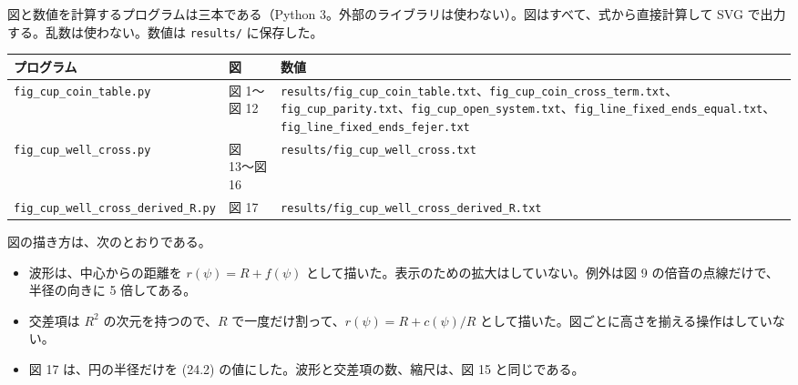 \documentclass[
  a4paper,
]{ltjsarticle}
\newcounter{none} %
\providecommand{\tightlist}{%
  \setlength{\itemsep}{0pt}\setlength{\parskip}{0pt}}
\begin{document}
図と数値を計算するプログラムは三本である（Python
3。外部のライブラリは使わない）。図はすべて、式から直接計算して SVG
で出力する。乱数は使わない。数値は \texttt{results/\allowbreak{}} に保存した。

{\def\LTcaptype{none} %
\begin{longtable}[]{@{}
  >{\raggedright\arraybackslash}p{}
  >{\raggedright\arraybackslash}p{}
  >{\raggedright\arraybackslash}p{}@{}}
\toprule\noalign{}
\begin{minipage}[b]{\linewidth}\raggedright
プログラム
\end{minipage} & \begin{minipage}[b]{\linewidth}\raggedright
図
\end{minipage} & \begin{minipage}[b]{\linewidth}\raggedright
数値
\end{minipage} \\
\midrule\noalign{}
\endhead
\bottomrule\noalign{}
\endlastfoot
\texttt{fig\_\allowbreak{}cup\_\allowbreak{}coin\_\allowbreak{}table.py} & 図 1〜図 12 &
\texttt{results/\allowbreak{}fig\_\allowbreak{}cup\_\allowbreak{}coin\_\allowbreak{}table.txt}、\texttt{fig\_\allowbreak{}cup\_\allowbreak{}coin\_\allowbreak{}cross\_\allowbreak{}term.txt}、\texttt{fig\_\allowbreak{}cup\_\allowbreak{}parity.txt}、\texttt{fig\_\allowbreak{}cup\_\allowbreak{}open\_\allowbreak{}system.txt}、\texttt{fig\_\allowbreak{}line\_\allowbreak{}fixed\_\allowbreak{}ends\_\allowbreak{}equal.txt}、\texttt{fig\_\allowbreak{}line\_\allowbreak{}fixed\_\allowbreak{}ends\_\allowbreak{}fejer.txt} \\
\texttt{fig\_\allowbreak{}cup\_\allowbreak{}well\_\allowbreak{}cross.py} & 図 13〜図 16 &
\texttt{results/\allowbreak{}fig\_\allowbreak{}cup\_\allowbreak{}well\_\allowbreak{}cross.txt} \\
\texttt{fig\_\allowbreak{}cup\_\allowbreak{}well\_\allowbreak{}cross\_\allowbreak{}derived\_\allowbreak{}R.py} & 図 17 &
\texttt{results/\allowbreak{}fig\_\allowbreak{}cup\_\allowbreak{}well\_\allowbreak{}cross\_\allowbreak{}derived\_\allowbreak{}R.txt} \\
\end{longtable}
}

図の描き方は、次のとおりである。

\begin{itemize}
\tightlist
\item
  波形は、中心からの距離を \(r(\psi)=R+f(\psi)\)
  として描いた。表示のための拡大はしていない。例外は図 9
  の倍音の点線だけで、半径の向きに 5 倍してある。
\item
  交差項は \(R^2\) の次元を持つので、\(R\)
  で一度だけ割って、\(r(\psi)=R+c(\psi)/R\)
  として描いた。図ごとに高さを揃える操作はしていない。
\item
  図 17 は、円の半径だけを (24.2)
  の値にした。波形と交差項の数、縮尺は、図 15 と同じである。
\end{itemize}
\end{document}

